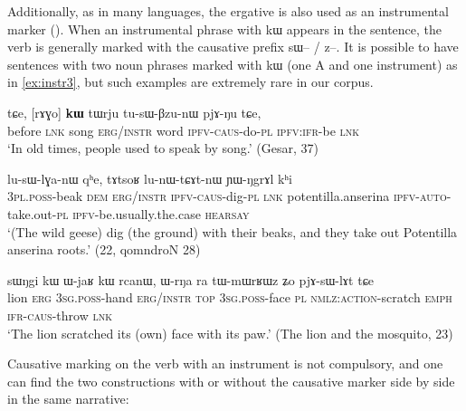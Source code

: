 \documentclass[oldfontcommands,oneside,a4paper,11pt]{article}
\newcommand{\ipa}[1]{{\phon #1}} %
\begin{document}
Additionally, as in many languages, the ergative is also used as an instrumental marker (\citealt[32]{agent02palancar}). When an  instrumental phrase with \ipa{kɯ}  appears in the sentence, the verb is generally marked with the causative prefix \ipa{sɯ}-- / \ipa{z}--. It is possible  to have sentences with two noun phrases marked with \ipa{kɯ} (one A and one instrument) as in \ref{ex:instr3}, but such examples are extremely rare in our corpus.

 \begin{exe}
\ex \label{ex:instr}
\gll \ipa{kɯɕɯŋgɯ}   	\ipa{tɕe,}   	[\ipa{rɤɣo}]   	\ipa{\textbf{kɯ}}   	\ipa{tɯrju}   	\ipa{tu-sɯ-βzu-nɯ}   	\ipa{pjɤ-ŋu}   	\ipa{tɕe,}     \\
before \textsc{lnk} song \textsc{erg/instr} word \textsc{ipfv}-\textsc{caus}-do-\textsc{pl} \textsc{ipfv:ifr}-be \textsc{lnk}\\
\glt  `In old times, people used to speak by song.' (Gesar, 37)
\end{exe}
 \begin{exe}
\ex \label{ex:instr2}
\gll [\ipa{nɯ-mtsioʁ}   	\ipa{nɯ}]   	\ipa{\textbf{kɯ}}   	\ipa{lu-sɯ-lɣa-nɯ}   	\ipa{qʰe,}   	\ipa{tɤtsoʁ}   	\ipa{lu-nɯ-tɕɤt-nɯ}   	\ipa{ɲɯ-ŋgrɤl}   	\ipa{kʰi}        \\
\textsc{3pl.poss}-beak \textsc{dem} \textsc{erg/instr} \textsc{ipfv-caus}-dig-\textsc{pl} \textsc{lnk} potentilla.anserina \textsc{ipfv-auto}-take.out-\textsc{pl} \textsc{ipfv}-be.usually.the.case \textsc{hearsay} \\
\glt  `(The wild geese) dig (the ground) with their beaks, and they take out Potentilla anserina roots.' (22, qomndroN 28)
\end{exe}

\begin{exe}
\ex \label{ex:instr3}
\gll
 \ipa{sɯŋgi} 	\ipa{kɯ} 	\ipa{ɯ-jaʁ} 	\ipa{kɯ} 	\ipa{rcanɯ,} 	\ipa{ɯ-rŋa} 	\ipa{ra} 	\ipa{tɯ-mɯrʁɯz} 	\ipa{ʑo} 	\ipa{pjɤ-sɯ-lɤt} 	\ipa{tɕe} \\
 lion \textsc{erg} \textsc{3sg.poss}-hand \textsc{erg/instr} \textsc{top} \textsc{3sg.poss}-face \textsc{pl} \textsc{nmlz:action}-scratch \textsc{emph} \textsc{ifr-caus}-throw \textsc{lnk}\\
\glt `The lion scratched its (own) face with its paw.' (The lion and the mosquito, 23)
\end{exe}
Causative marking on the verb with an instrument is not compulsory, and one can find the two constructions with or without the causative marker side by side in the same narrative:
\end{document}
